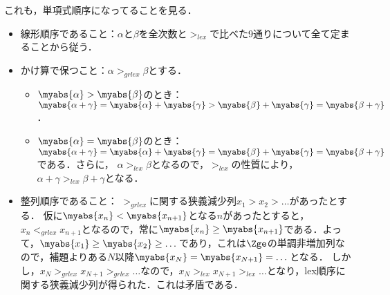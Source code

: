これも，単項式順序になってることを見る．
\begin{myproof}
 \begin{itemize}
  \item 線形順序であること：$\alpha$と$\beta$を全次数と$>_{lex}$で比べた9通りについて全て定まることから従う．
  \item かけ算で保つこと：$\alpha >_{grlex} \beta$とする．
\begin{itemize}
 \item $\myabs{\alpha}> \myabs{\beta}$のとき：
$\myabs{\alpha + \gamma} = \myabs{\alpha} + \myabs{\gamma} > \myabs{\beta}+\myabs{\gamma} = \myabs{\beta+\gamma}$．
 \item $\myabs{\alpha} = \myabs{\beta}$のとき：
$\myabs{\alpha + \gamma} = \myabs{\alpha} +\myabs{\gamma} = \myabs{\beta}+\myabs{\gamma} = \myabs{\beta + \gamma}$である．さらに，
$\alpha >_{lex} \beta$となるので，$>_{lex}$の性質により，$\alpha + \gamma >_{lex} \beta + \gamma$となる．
\end{itemize}
  \item 整列順序であること：
$>_{grlex}$に関する狭義減少列$x_1 > x_2 > \dots$があったとする．
仮に$\myabs{x_n} < \myabs{x_{n+1}}$となる$n$があったとすると，$x_n <_{grlex} x_{n+1}$となるので，常に$\myabs{x_n} \ge \myabs{x_{n+1}}$である．よって，$\myabs{x_1} \ge \myabs{x_2} \ge \dots$であり，これは$\Zge$の単調非増加列なので，補題よりある$N$以降$\myabs{x_{N}}=\myabs{x_{N+1}}=\dots$となる．
しかし，$x_N >_{grlex} x_{N+1} >_{grlex} \dots$なので，$x_{N} >_{lex} x_{N+1} >_{lex} \dots$となり，lex順序に関する狭義減少列が得られた．これは矛盾である．
 \end{itemize}
\end{myproof}

